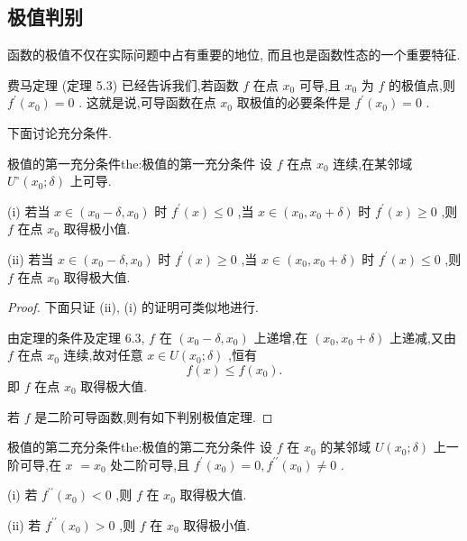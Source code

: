 \subsection{极值判别}

函数的极值不仅在实际问题中占有重要的地位, 而且也是函数性态的一个重要特征.

费马定理 (定理 5.3) 已经告诉我们,若函数 \(f\) 在点 \({x}_{0}\) 可导,且 \({x}_{0}\) 为 \(f\) 的极值点,则 \({f}^{\prime }\left( {x}_{0}\right)  = 0\) . 这就是说,可导函数在点 \({x}_{0}\) 取极值的必要条件是 \({f}^{\prime }\left( {x}_{0}\right)  = 0\) .

下面讨论充分条件.

\begin{theorem}{极值的第一充分条件}{the:极值的第一充分条件}
设 \(f\) 在点 \({x}_{0}\) 连续,在某邻域 \({U}^{ \circ  }\left( {{x}_{0};\delta }\right)\) 上可导.

(i) 若当 \(x \in  \left( {{x}_{0} - \delta ,{x}_{0}}\right)\) 时 \({f}^{\prime }\left( x\right)  \leq  0\) ,当 \(x \in  \left( {{x}_{0},{x}_{0} + \delta }\right)\) 时 \({f}^{\prime }\left( x\right)  \geq  0\) ,则 \(f\) 在点 \({x}_{0}\) 取得极小值.

(ii) 若当 \(x \in  \left( {{x}_{0} - \delta ,{x}_{0}}\right)\) 时 \({f}^{\prime }\left( x\right)  \geq  0\) ,当 \(x \in  \left( {{x}_{0},{x}_{0} + \delta }\right)\) 时 \({f}^{\prime }\left( x\right)  \leq  0\) ,则 \(f\) 在点 \({x}_{0}\) 取得极大值.
\end{theorem}


\begin{proof}
下面只证 (ii), (i) 的证明可类似地进行.

由定理的条件及定理 6.3, \(f\) 在 \(\left( {{x}_{0} - \delta ,{x}_{0}}\right)\) 上递增,在 \(\left( {{x}_{0},{x}_{0} + \delta }\right)\) 上递减,又由 \(f\) 在点 \({x}_{0}\) 连续,故对任意 \(x \in  U\left( {{x}_{0};\delta }\right)\) ,恒有
\[
f\left( x\right)  \leq  f\left( {x}_{0}\right) .
\]
即 \(f\) 在点 \({x}_{0}\) 取得极大值.

若 \(f\) 是二阶可导函数,则有如下判别极值定理.
\end{proof}


\begin{theorem}{极值的第二充分条件}{the:极值的第二充分条件}
设 \(f\) 在 \({x}_{0}\) 的某邻域 \(U\left( {{x}_{0};\delta }\right)\) 上一阶可导,在 \(x\)  \(= {x}_{0}\) 处二阶可导,且 \({f}^{\prime }\left( {x}_{0}\right)  = 0,{f}^{\prime \prime }\left( {x}_{0}\right)  \neq  0\) .

(i) 若 \({f}^{\prime \prime }\left( {x}_{0}\right)  < 0\) ,则 \(f\) 在 \({x}_{0}\) 取得极大值.

(ii) 若 \({f}^{\prime \prime }\left( {x}_{0}\right)  > 0\) ,则 \(f\) 在 \({x}_{0}\) 取得极小值.
\end{theorem}


